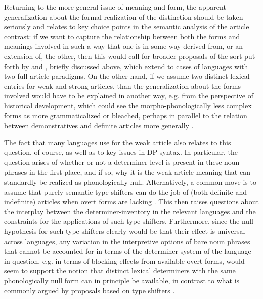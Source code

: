 \documentclass[output=paper
,modfonts
,nonflat]{langscibook}
\begin{document}
Returning to the more general issue of meaning and form, the apparent
generalization about the formal realization of the distinction should be
taken seriously and relates to key choice points in the semantic
analysis of the article contrast: if we want to capture the
relationship between both the forms and meanings involved in such a
way that one is in some way derived from, or an extension of, the
other, then this would call for broader proposals of the sort put
forth by \citet{Hanink2016} and \citet{Hanink2015}, briefly
discussed above, which extend
to cases of languages with two full article paradigms. On the other
hand, if we assume two distinct lexical entries for weak and strong
articles, than the generalization about the forms involved would have
to be explained in another way, e.g. from the perspective of
historical development, which could see the morpho-phonologically less
complex forms as more grammaticalized or
bleached, perhaps in parallel to the relation between demonstratives
and definite articles more generally \citep{Lyons1999}. 


The fact that many languages use  for the weak
article also relates to this question, of course, as well as to key
issues in DP-syntax. In particular, the question arises of whether or
not a determiner-level is present in these noun phrases in the first
place, and if so, why it is the weak article meaning that can
standardly be realized as phonologically null. Alternatively, a common
move is to assume that purely semantic type-shifters can do the job
of (both definite and indefinite) articles when overt forms are
lacking \citep{Partee1987,Chierchia1998,Dayal2004}. This then raises
questions about the interplay between the determiner-inventory in the
relevant languages and the constraints for the applications of such
type-shifters. Furthermore, since the null-hypothesis for such type
shifters clearly would be that their effect is universal across
languages, any variation in the interpretive options of bare noun
phrases that cannot be accounted for in terms of the determiner system
of the language in question, e.g. in terms of blocking effects from
available overt forms, would seem to support the notion that distinct
lexical determiners with the same phonologically null form can in
principle be available, in contrast to what is commonly argued by
proposals based on type shifters \citep[for recent discussion,
see][]{Dayal2016}.
\end{document}
